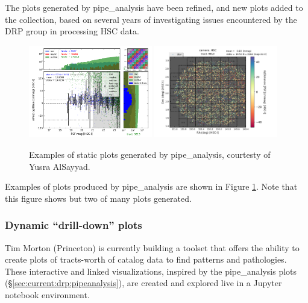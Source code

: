 \documentclass[DM,authoryear,toc,lsstdraft]{lsstdoc}
\begin{document}
The plots generated by pipe\_analysis have been refined, and new plots added
to the collection, based on several years of investigating issues encountered
by the DRP group in processing HSC data.

\begin{figure}
\begin{center}
\includegraphics[width=0.48\textwidth]{figures/plot-t9813-color_wPerp-psfMagHist.png}
\includegraphics[width=0.48\textwidth]{figures/plot-t9813-rizDistancePSF-sky-stars.png}
\end{center}
\caption{Examples of static plots generated by pipe\_analysis, courtesty of Yusra
AlSayyad.}
\label{fig:pipeanalysis}
\end{figure}

Examples of plots produced by pipe\_analysis are shown in Figure
\ref{fig:pipeanalysis}. Note that this figure shows but two of many plots
generated.

\subsubsection{Dynamic ``drill-down'' plots}
\label{sec:current:drp:drilldown}

Tim Morton (Princeton) is currently building a toolset that offers the ability
to create plots of tracts-worth of catalog data to find patterns and
pathologies. These interactive and linked visualizations, inspired by the
pipe\_analysis plots (\S\ref{sec:current:drp:pipeanalysis}), are created and
explored live in a Jupyter notebook environment.
\end{document}
